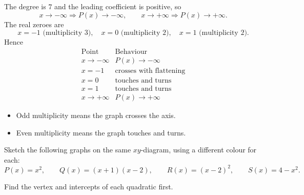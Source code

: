 \begin{solution}
The degree is $7$ and the leading coefficient is positive, so
\[
x\to-\infty \Rightarrow P(x)\to-\infty,\qquad
x\to+\infty \Rightarrow P(x)\to+\infty.
\]
The real zeroes are
\[
x=-1 \text{ (multiplicity }3),\quad x=0 \text{ (multiplicity }2),\quad x=1 \text{ (multiplicity }2).
\]
Hence
\[
\begin{array}{c|c}
\text{Point} & \text{Behaviour}\\ \hline
x\to-\infty & P(x)\to-\infty\\
x=-1 & \text{crosses with flattening}\\
x=0 & \text{touches and turns}\\
x=1 & \text{touches and turns}\\
x\to+\infty & P(x)\to+\infty
\end{array}
\]

\begin{center}
\end{center}
\end{solution}

\begin{takeaways}
\begin{itemize}[leftmargin=*]
\item Odd multiplicity means the graph crosses the axis.
\item Even multiplicity means the graph touches and turns.
\end{itemize}
\end{takeaways}

\begin{problem}
Sketch the following graphs on the same $xy$-diagram, using a different colour for each:
\[
P(x)=x^2,\qquad Q(x)=(x+1)(x-2),\qquad R(x)=(x-2)^2,\qquad S(x)=4-x^2.
\]
\end{problem}

\begin{hintbox}
Find the vertex and intercepts of each quadratic first.
\end{hintbox}

